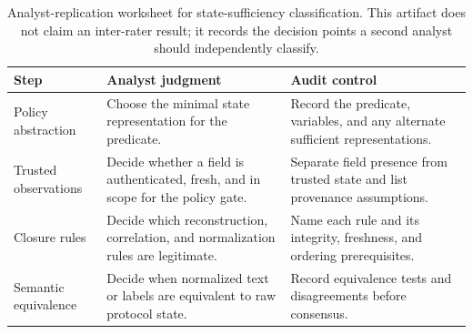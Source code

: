 \begin{table}[t]
  \caption{Analyst-replication worksheet for state-sufficiency classification.
  This artifact does not claim an inter-rater result; it records the decision
  points a second analyst should independently classify.}
  \label{tab:analyst-worksheet}
  \centering\footnotesize
  \begin{tabular}{@{}p{}p{}p{}@{}}
    \toprule
    Step & Analyst judgment & Audit control \\
    \midrule
    Policy abstraction & Choose the minimal state representation for the predicate. & Record the predicate, variables, and any alternate sufficient representations. \\
    Trusted observations & Decide whether a field is authenticated, fresh, and in scope for the policy gate. & Separate field presence from trusted state and list provenance assumptions. \\
    Closure rules & Decide which reconstruction, correlation, and normalization rules are legitimate. & Name each rule and its integrity, freshness, and ordering prerequisites. \\
    Semantic equivalence & Decide when normalized text or labels are equivalent to raw protocol state. & Record equivalence tests and disagreements before consensus. \\
    \bottomrule
  \end{tabular}
\end{table}
